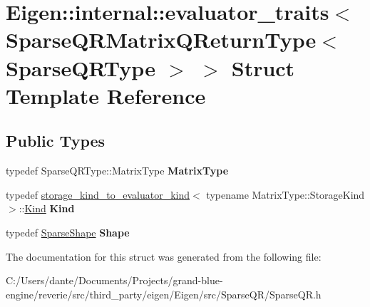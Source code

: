 \hypertarget{struct_eigen_1_1internal_1_1evaluator__traits_3_01_sparse_q_r_matrix_q_return_type_3_01_sparse_q_r_type_01_4_01_4}{}\section{Eigen\+::internal\+::evaluator\+\_\+traits$<$ Sparse\+Q\+R\+Matrix\+Q\+Return\+Type$<$ Sparse\+Q\+R\+Type $>$ $>$ Struct Template Reference}
\label{struct_eigen_1_1internal_1_1evaluator__traits_3_01_sparse_q_r_matrix_q_return_type_3_01_sparse_q_r_type_01_4_01_4}
\subsection*{Public Types}
\begin{DoxyCompactItemize}
\item 
\mbox{\label{struct_eigen_1_1internal_1_1evaluator__traits_3_01_sparse_q_r_matrix_q_return_type_3_01_sparse_q_r_type_01_4_01_4_ab28b57aa5e4382128b7d749685cfff58}} 
typedef Sparse\+Q\+R\+Type\+::\+Matrix\+Type {\bfseries Matrix\+Type}
\item 
\mbox{\label{struct_eigen_1_1internal_1_1evaluator__traits_3_01_sparse_q_r_matrix_q_return_type_3_01_sparse_q_r_type_01_4_01_4_aa476f75700cee6288294cbc8100b663f}} 
typedef \mbox{\hyperlink{struct_eigen_1_1internal_1_1storage__kind__to__evaluator__kind}{storage\+\_\+kind\+\_\+to\+\_\+evaluator\+\_\+kind}}$<$ typename Matrix\+Type\+::\+Storage\+Kind $>$\+::\mbox{\hyperlink{struct_eigen_1_1internal_1_1_index_based}{Kind}} {\bfseries Kind}
\item 
\mbox{\label{struct_eigen_1_1internal_1_1evaluator__traits_3_01_sparse_q_r_matrix_q_return_type_3_01_sparse_q_r_type_01_4_01_4_a4b5651db5c020cc969b35ef8ddca5bf9}} 
typedef \mbox{\hyperlink{struct_eigen_1_1_sparse_shape}{Sparse\+Shape}} {\bfseries Shape}
\end{DoxyCompactItemize}


The documentation for this struct was generated from the following file\+:\begin{DoxyCompactItemize}
\item 
C\+:/\+Users/dante/\+Documents/\+Projects/grand-\/blue-\/engine/reverie/src/third\+\_\+party/eigen/\+Eigen/src/\+Sparse\+Q\+R/Sparse\+Q\+R.\+h\end{DoxyCompactItemize}
